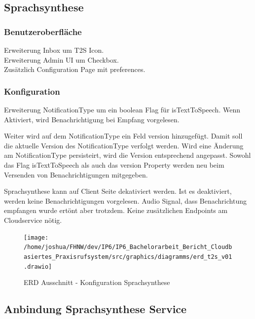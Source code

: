 \subsection{Sprachsynthese}

\subsubsection*{Benutzeroberfläche}

Erweiterung Inbox um T2S Icon. \\
Erweiterung Admin UI um Checkbox. \\
Zusätzlich Configuration Page mit preferences. \\

\subsubsection*{Konfiguration}

Erweiterung NotificationType um ein boolean Flag für isTextToSpeech.
Wenn Aktiviert, wird Benachrichtigung bei Empfang vorgelesen.

Weiter wird auf dem NotificationType ein Feld version hinzugefügt.
Damit soll die aktuelle Version des NotificationType verfolgt werden.
Wird eine Änderung am NotificationType persisteirt, wird die Version entsprechend angepasst.
Sowohl das Flag isTextToSpeech als auch das version Property werden neu beim Versenden von Benachrichtigungen mitgegeben.

Sprachsynthese kann auf Client Seite dekativiert werden.
Ist es deaktiviert, werden keine Benachrichtigungen vorgelesen.
Audio Signal, dass Benachrichtung empfangen wurde ertönt aber trotzdem.
Keine zusätzlichen Endpoints am Cloudservice nötig. \\

\begin{figure}[h]
    \centering
    \begin{minipage}[b]{0.75\textwidth}
        \texttt{[image: /home/joshua/FHNW/dev/IP6/IP6\_Bachelorarbeit\_Bericht\_Cloudbasiertes\_Praxisrufsystem/src/graphics/diagramms/erd\_t2s\_v01.drawio]}
        \caption{ERD Ausschnitt - Konfiguration Sprachsynthese}
    \end{minipage}
\end{figure}

\clearpage

\subsection*{Anbindung Sprachsynthese Service}

